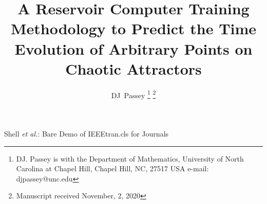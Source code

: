 \documentclass[journal]{journal}
\begin{document}
%
\title{A Reservoir Computer Training Methodology to Predict the Time Evolution of Arbitrary Points on Chaotic Attractors}
%
%
%

\author{DJ~Passey
\thanks{DJ. Passey is with the Department
of Mathematics, University of North Carolina at Chapel Hill,
Chapel Hill, NC, 27517 USA e-mail: djpassey@unc.edu}%
\thanks{Manuscript received November, 2, 2020}}

% 
%



%
{Shell \MakeLowercase{\textit{et al.}}: Bare Demo of IEEEtran.cls for Journals}
% 
\end{document}
